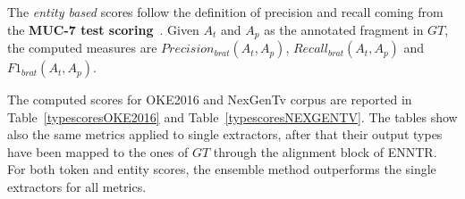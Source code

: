 \documentclass{llncs}
\newcommand{\tabref}[1]{\mbox{Table~\ref{#1}}}
\begin{document}
The \textit{entity based} scores follow the definition of precision and recall coming from the \textbf{MUC-7 test scoring}~\cite{M98-1024}. Given $A_{t}$ and $A_{p}$ as the annotated fragment in $GT$, the computed measures are 
$Precision_{brat}(A_{t},A_{p})$, $Recall_{brat}(A_{t},A_{p})$ and 
$F1_{brat}(A_{t},A_{p})$. 


The computed scores for OKE2016 and NexGenTv corpus are reported in \tabref{typescoresOKE2016} and \tabref{typescoresNEXGENTV}. The tables show also the same metrics applied to single extractors, after that their output types have been mapped to the ones of $GT$ through the alignment block of ENNTR. For both token and entity scores, the ensemble method outperforms the single extractors for all metrics.
\end{document}
